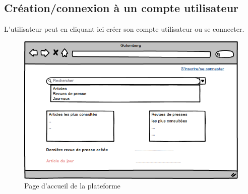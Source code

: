 \subsection{Création/connexion à un compte utilisateur}
\label{sec:arrivee_utilisateur}
L’utilisateur peut en cliquant ici créer son compte utilisateur ou se connecter.

    \begin{figure}[H]
        \centering
        \includegraphics[width=\textwidth]{figures/Accueil.png}
            \caption{Page d'accueil de la plateforme}
            \label{fig:accueil}
    \end{figure}